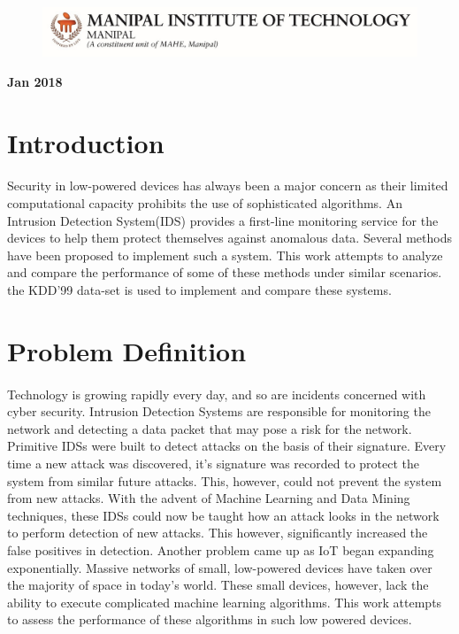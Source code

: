 \documentclass[a4paper,12pt]{article}
\begin{document}
\begin{titlepage}
		\begin{figure}[h]
	  	\begin{center}
		\includegraphics{MITLogo}
		\end{center}
		\end{figure}
		\begin{center}
		\textbf{Jan 2018}
		\end{center}

	\end{titlepage}


	\newpage

	\section{Introduction}
	\paragraph{}
	Security in low-powered devices has always been a major concern as their limited computational capacity prohibits the use of sophisticated algorithms. An Intrusion Detection System(IDS) provides a first-line monitoring service for the devices to help them protect themselves against anomalous data. Several methods have been proposed to implement such a system. This work attempts to analyze and compare the performance of some of these methods under similar scenarios. the KDD'99 data-set is used to implement and compare these systems.

	\section{Problem Definition}
	\paragraph{}
	Technology is growing rapidly every day, and so are incidents concerned with cyber security. Intrusion Detection Systems are responsible for monitoring the network and detecting a data packet that may pose a risk for the network. Primitive IDSs were built to detect attacks on the basis of their signature. Every time a new attack was discovered, it's signature was recorded to protect the system from similar future attacks. This, however, could not prevent the system from new attacks. With the advent of Machine Learning and Data Mining techniques, these IDSs could now be taught how an attack looks in the network to perform detection of new attacks. This however, significantly increased the false positives in detection. Another problem came up as IoT began expanding exponentially. Massive networks of small, low-powered devices have taken over the majority of space in today's world. These small devices, however, lack the ability to execute complicated machine learning algorithms. This work attempts to assess the performance of these algorithms in such low powered devices.
\end{document}

